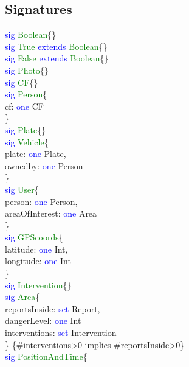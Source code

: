\subsection{Signatures}
\textcolor{blue}{sig}
\textcolor{green}{Boolean}\{\} \\
\textcolor{blue}{sig}
\textcolor{green}{True}
\textcolor{blue}{extends}
\textcolor{green}{Boolean}\{\} \\ 
\textcolor{blue}{sig}
\textcolor{green}{False}
\textcolor{blue}{extends}
\textcolor{green}{Boolean}\{\} \\
\textcolor{blue}{sig}
\textcolor{green}{Photo}\{\} \\
\textcolor{blue}{sig}
\textcolor{green}{CF}\{\} \\
\textcolor{blue}{sig}
\textcolor{green}{Person}\{ \\
cf: \textcolor{blue}{one} CF\\
\} \\
\textcolor{blue}{sig}
\textcolor{green}{Plate}\{\} \\
\textcolor{blue}{sig}
\textcolor{green}{Vehicle}\{ \\
plate: \textcolor{blue}{one} Plate,\\
ownedby: \textcolor{blue}{one} Person\\
\} \\
\textcolor{blue}{sig}
\textcolor{green}{User}\{ \\
person: \textcolor{blue}{one} Person,\\
areaOfInterest: \textcolor{blue}{one} Area\\ 
\} \\
\textcolor{blue}{sig}
\textcolor{green}{GPScoords}\{ \\
latitude: \textcolor{blue}{one} Int,\\
longitude: \textcolor{blue}{one} Int\\ 
\} \\
\textcolor{blue}{sig}
\textcolor{green}{Intervention}\{\} \\
\textcolor{blue}{sig}
\textcolor{green}{Area}\{ \\
reportsInside: \textcolor{blue}{set} Report,\\
dangerLevel: \textcolor{blue}{one} Int\\ 
interventions: \textcolor{blue}{set} Intervention\\
\} \{\#interventions>0 implies \#reportsInside>0\}\\
\textcolor{blue}{sig}
\textcolor{green}{PositionAndTime}\{ \\
